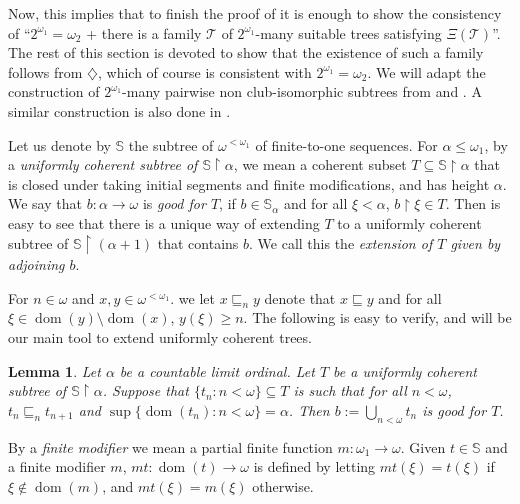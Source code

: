 \documentclass[a4paper,noamsfonts]{amsart}
\newtheorem{lemma}[theorem]{Lemma}
\theoremstyle{definition}
\newcommand{\seb}{\subseteq}
\newcommand{\setm}{\setminus}
\newcommand{\tleq}{\sqsubseteq}
\newcommand{\res}{\!\upharpoonright\!}
\newcommand{\1}{\mathbbm{1}}
\newcommand{\dia}{\diamondsuit}
\newcommand{\T}{\mathcal{T}}
\newcommand{\prop}{\Xi}
\renewcommand{\S}{\mathbb{S}}
\DeclareMathOperator{\dom}{dom}
\begin{document}
Now, this implies that
to finish the proof of  it is enough to
show the consistency of ``$2^{\omega_{1}} = \omega_{2}$
+ there is a family $\T$ of $2^{\omega_{1}}$-many suitable trees
satisfying $\prop(\T)$''. The rest of this section is devoted to show that
the existence of such a family follows from
$\dia$, which of course is consistent with $2^{\omega_{1}} = \omega_{2}$.
We will adapt the construction
of $2^{\omega_{1}}$-many pairwise non club-isomorphic subtrees from
\cite{ShelahAbraham} and \cite{MartinezThesis}. A similar construction
is also done in \cite{ChavezKrueger}. 

Let us denote by $\S$ the subtree of $\omega^{<\omega_{1}}$ of finite-to-one
sequences.
For $\alpha \le \omega_{1}$, by a \emph{uniformly
  coherent subtree of $\S\res \alpha$},
we mean a coherent subset $T \seb \S\res\alpha$ that is closed under
taking initial segments and finite modifications,
and has height $\alpha$. We say that $b : \alpha \to \omega$
is \emph{good for $T$}, if $b \in \S_{\alpha}$ and
for all $\xi < \alpha$, $b\res \xi \in T$. Then
is easy to see
that there is a unique way of extending $T$ to
a uniformly coherent subtree of $\S \res (\alpha+1)$ that contains
$b$. We call this the \emph{extension of $T$ given by adjoining $b$}.

For $n \in \omega$ and $x,y \in \omega^{<\omega_{1}}$.
we let $x \tleq_{n} y$ denote that $x \tleq y$ and for all $\xi \in
\dom(y)\setm\dom(x)$, $y(\xi) \ge n$.
The following is easy to verify, and will be our main tool to extend
uniformly coherent trees.

\begin{lemma}\label{lem:fund-ext}
  Let $\alpha$ be a countable limit ordinal. Let $T$ be a uniformly
  coherent subtree of $\S \res \alpha$. Suppose that
  $\{t_{n} : n < \omega\} \seb T$ is such that for all $n < \omega$,
  $t_{n} \tleq_{n} t_{n+1}$ and
  $\sup\{\dom(t_{n}) : n < \omega\} = \alpha$. Then
  $b := \bigcup_{n < \omega}t_{n}$ is good for $T$.
\end{lemma}

By a \emph{finite modifier} we mean a partial finite function
$m : \omega_{1} \to \omega$. Given $t \in \S$ and a finite modifier
$m$, $mt : \dom(t) \to \omega$ is defined by letting
$mt(\xi) = t(\xi)$ if $\xi \notin \dom(m)$, and
$mt(\xi) = m(\xi)$ otherwise.
\end{document}
